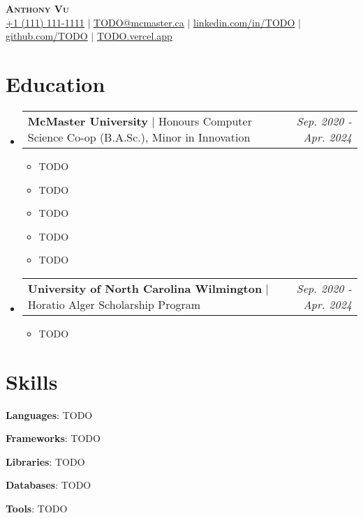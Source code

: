 \documentclass[letterpaper,11pt]{article}
\makeatletter
\newcommand{\resumeItem}[1]{
  \item\small{
    {#1 \vspace{-2pt}}
  }
}
\newcommand{\resumeCustomHeading}[3]{
    \item
    \begin{tabular*}{0.97\textwidth}{l@{\extracolsep{\fill}}r}
      \textbf{#1} $|$ \small{#2} & \emph{\small{#3}} \\
    \end{tabular*}\vspace{-7pt}
}
\newcommand{\resumeSubHeadingListStart}{\begin{itemize}[leftmargin=0.15in, label={}]}
\newcommand{\resumeSubHeadingListEnd}{\end{itemize}}
\newcommand{\resumeItemListStart}{\begin{itemize}}
\newcommand{\resumeItemListEnd}{\end{itemize}\vspace{-5pt}}
\makeatother
\begin{document}
\begin{center}
    \textbf{\Huge \scshape Anthony Vu} \\ \vspace{1pt}
    \small \href{tel:111-111-1111}{\ul{+1 (111) 111-1111}} $|$
    \href{mailto:TODO@mcmaster.ca}{\ul{TODO@mcmaster.ca}} $|$ 
    \href{https://linkedin.com/in/TODO/}{\ul{linkedin.com/in/TODO}} $|$
    \href{https://github.com/TODO/}{\ul{github.com/TODO}} $|$
    \href{https://TODO.vercel.app/}{\ul{TODO.vercel.app}}
\end{center}

\section{Education}
  \resumeSubHeadingListStart

    \resumeCustomHeading{McMaster University}{Honours Computer Science Co-op (B.A.Sc.), Minor in Innovation}{Sep. 2020 - Apr. 2024}
      \resumeItemListStart
        \resumeItem{TODO}
        \resumeItem{TODO}
        \resumeItem{TODO}
        \resumeItem{TODO}
        \resumeItem{TODO}
      \resumeItemListEnd
      
    \resumeCustomHeading{University of North Carolina Wilmington}{Horatio Alger Scholarship Program}{Sep. 2020 - Apr. 2024}
      \resumeItemListStart
        \resumeItem{TODO}
      \resumeItemListEnd

  \resumeSubHeadingListEnd

\section{Skills}
 \begin{itemize}[leftmargin=0.15in, label={}]
    \small{
        \setlength\itemsep{0mm}
        \item{
         \textbf{Languages}{: TODO} \\
        }
        \item{
         \textbf{Frameworks}{: TODO} \\
        }
        \item{
         \textbf{Libraries}{: TODO} \\
        }
        \item{
         \textbf{Databases}{: TODO} \\
        }
        \item{
         \textbf{Tools}{: TODO} \\
        }
    }
 \end{itemize}
\end{document}
